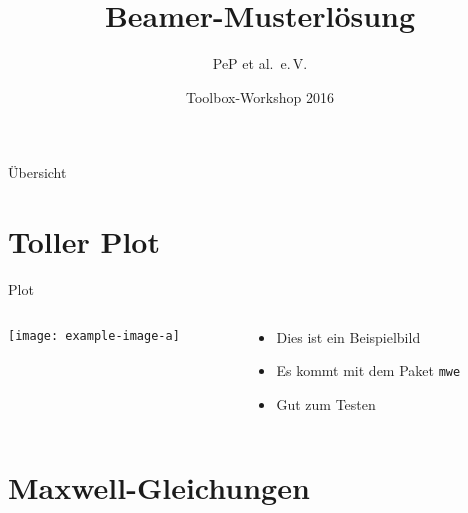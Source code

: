 \documentclass{beamer}
\author{PeP et al.\ e.\,V.}
\institute{TU Dortmund}
\date{Toolbox-Workshop 2016}
\title{Beamer-Musterlösung}
\begin{document}
\begin{frame}
  \maketitle
\end{frame}

\begin{frame}{Übersicht}
  \tableofcontents
\end{frame}

\section{Toller Plot}

\begin{frame}{Plot}
  \begin{columns}[c, onlytextwidth]
    \begin{column}{0.42\textwidth}
      \texttt{[image: example-image-a]}
    \end{column}
    \begin{column}{0.52\textwidth}
      \begin{itemize}
        \item Dies ist ein Beispielbild
        \item Es kommt mit dem Paket \texttt{mwe}
        \item Gut zum Testen
      \end{itemize}
    \end{column}
  \end{columns} 
\end{frame}

\section{Maxwell-Gleichungen}
\end{document}
